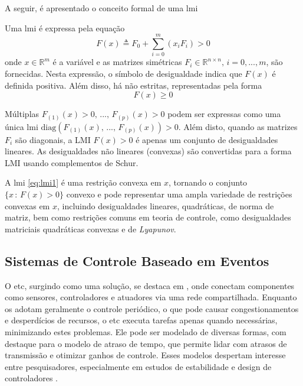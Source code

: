 A seguir, é apresentado o conceito formal de uma \acrshort{lmi}

\begin{definition}
  Uma \acrshort{lmi} é expressa pela equação \begin{equation} F(x) \triangleq F_0 + \sum_{i=0}^{m}(x_iF_i) > 0 \label{eq:lmi1}\end{equation} onde $x \in \mathbb{R}^m$ é a variável e as matrizes simétricas $F_i \in \mathbb{R}^{n \times n}, \, i = 0, . . . , m$, são fornecidas. Nesta expressão, o símbolo de desigualdade indica que $F(x)$ é definida positiva. Além disso, há  não estritas, representadas pela forma \begin{equation} F(x) \geq 0 \end{equation}
\end{definition}

Múltiplas   $F_{(1)}(x) > 0, \, ..., \, F_{(p)}(x) > 0$ podem ser expressas como uma única \acrshort{lmi} $\mathrm{diag}(F_{(1)}(x), \, ..., \, F_{(p)}(x)) > 0$. Além disto, quando as matrizes $F_i$ são diagonais, a LMI $F(x) > 0$ é apenas um conjunto de desigualdades lineares. As desigualdades não lineares (convexas) são convertidas para a forma LMI usando complementos de Schur.

A \acrshort{lmi} \eqref{eq:lmi1} é uma restrição convexa em $x$, tornando o conjunto $\{x \, : \, F(x) > 0\}$ convexo e pode representar uma ampla variedade de restrições convexas em $x$, incluindo desigualdades lineares, quadráticas, de norma de matriz, bem como restrições comuns em teoria de controle, como desigualdades matriciais quadráticas convexas e de \textit{Lyapunov}.

\subsection{Sistemas de Controle Baseado em Eventos} \label{subsection:etc}

O \acrshort{etc}, surgindo como uma solução, se destaca em , onde conectam componentes como sensores, controladores e atuadores via uma rede compartilhada. Enquanto os  adotam geralmente o controle periódico, o que pode causar congestionamentos e desperdícios de recursos, o \acrshort{etc} executa tarefas apenas quando necessárias, minimizando estes problemas. Ele pode ser modelado de diversas formas, com destaque para o modelo de atraso de tempo, que permite lidar com atrasos de transmissão e otimizar ganhos de controle. Esses modelos despertam interesse entre pesquisadores, especialmente em estudos de estabilidade e design de controladores \citep{peng2018}.

